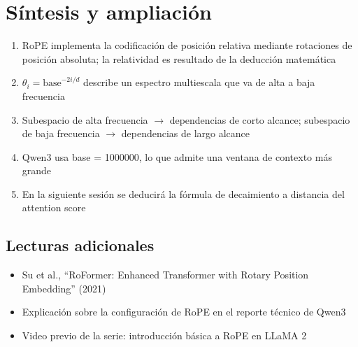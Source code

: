 \section{Síntesis y ampliación}

\begin{enumerate}
  \item RoPE implementa la codificación de posición relativa mediante rotaciones de posición absoluta; la relatividad es resultado de la deducción matemática
  \item $\theta_i = \text{base}^{-2i/d}$ describe un espectro multiescala que va de alta a baja frecuencia
  \item Subespacio de alta frecuencia $\to$ dependencias de corto alcance; subespacio de baja frecuencia $\to$ dependencias de largo alcance
  \item Qwen3 usa base = 1000000, lo que admite una ventana de contexto más grande
  \item En la siguiente sesión se deducirá la fórmula de decaimiento a distancia del attention score
\end{enumerate}

\subsection{Lecturas adicionales}
\begin{itemize}
  \item Su et al., ``RoFormer: Enhanced Transformer with Rotary Position Embedding'' (2021)
  \item Explicación sobre la configuración de RoPE en el reporte técnico de Qwen3
  \item Video previo de la serie: introducción básica a RoPE en LLaMA 2
\end{itemize}


